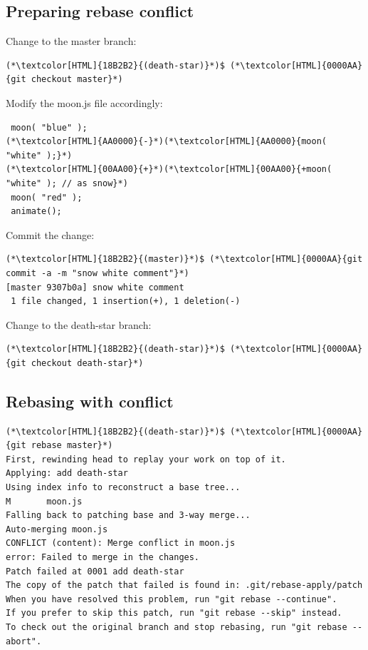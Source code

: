 \subsection{Preparing rebase conflict}
\begin{frame}[fragile]
  \subslidetitle
  Change to the master branch:
   \begin{lstlisting}
(*\textcolor[HTML]{18B2B2}{(death-star)}*)$ (*\textcolor[HTML]{0000AA}{git checkout master}*)
\end{lstlisting}

  Modify the moon.js file accordingly:
  \begin{lstlisting}
 moon( "blue" );
(*\textcolor[HTML]{AA0000}{-}*)(*\textcolor[HTML]{AA0000}{moon( "white" );}*)
(*\textcolor[HTML]{00AA00}{+}*)(*\textcolor[HTML]{00AA00}{+moon( "white" ); // as snow}*)
 moon( "red" );
 animate();
\end{lstlisting}

  Commit the change:
  \begin{lstlisting}
(*\textcolor[HTML]{18B2B2}{(master)}*)$ (*\textcolor[HTML]{0000AA}{git commit -a -m "snow white comment"}*)
[master 9307b0a] snow white comment
 1 file changed, 1 insertion(+), 1 deletion(-)
\end{lstlisting}
  Change to the death-star branch:
   \begin{lstlisting}
(*\textcolor[HTML]{18B2B2}{(death-star)}*)$ (*\textcolor[HTML]{0000AA}{git checkout death-star}*)
\end{lstlisting}
\end{frame}

\subsection{Rebasing with conflict}
\begin{frame}[fragile]
  \subslidetitle
  \begin{lstlisting}
(*\textcolor[HTML]{18B2B2}{(death-star)}*)$ (*\textcolor[HTML]{0000AA}{git rebase master}*)
First, rewinding head to replay your work on top of it.
Applying: add death-star
Using index info to reconstruct a base tree...
M       moon.js
Falling back to patching base and 3-way merge...
Auto-merging moon.js
CONFLICT (content): Merge conflict in moon.js
error: Failed to merge in the changes.
Patch failed at 0001 add death-star
The copy of the patch that failed is found in: .git/rebase-apply/patch
When you have resolved this problem, run "git rebase --continue".
If you prefer to skip this patch, run "git rebase --skip" instead.
To check out the original branch and stop rebasing, run "git rebase --abort".
\end{lstlisting}
\end{frame}

